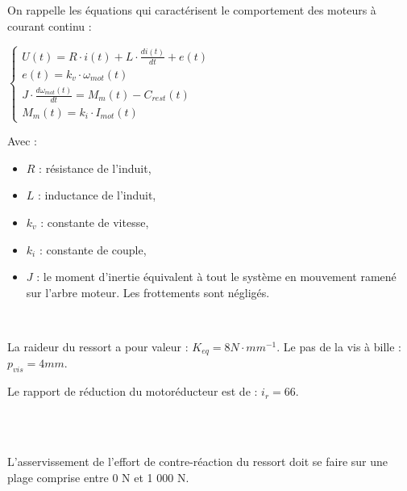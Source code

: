 On rappelle les équations qui caractérisent le comportement des moteurs à courant continu :
\begin{center}
$\left\{\begin{array}{l}
U(t)=R\cdot i(t) + L\cdot\frac{di(t)}{dt}+e(t)\\
e(t)=k_v\cdot \omega_{mot}(t)\\
J\cdot\frac{d\omega_{mot}(t)}{dt}=M_m(t)-C_{rest}(t)\\
M_m(t)=k_i\cdot I_{mot}(t)
\end{array}\right.$
\end{center}

Avec :\\
\begin{minipage}{0.45\linewidth}
\begin{itemize}
 \item $R$ : résistance de l'induit,
 \item $L$ : inductance de l'induit,
 \item $k_v$ : constante de vitesse,
\end{itemize}
\end{minipage}\hfill
\begin{minipage}{0.45\linewidth}
\begin{itemize}
 \item $k_i$ : constante de couple,
 \item $J$ : le moment d'inertie équivalent à tout le système en mouvement ramené sur l'arbre moteur. Les frottements sont négligés.
\end{itemize}
\end{minipage}




~\

La raideur du ressort a pour valeur : $K_{eq}=8N\cdot mm^{-1}$. Le pas de la vis à bille : $p_{vis}=4mm$.

Le rapport de réduction du motoréducteur est de : $i_r=66$.


~\ \\ ~\

L'asservissement de l'effort de contre-réaction du ressort doit se faire sur une plage comprise entre 0 N et 1 000 N.

